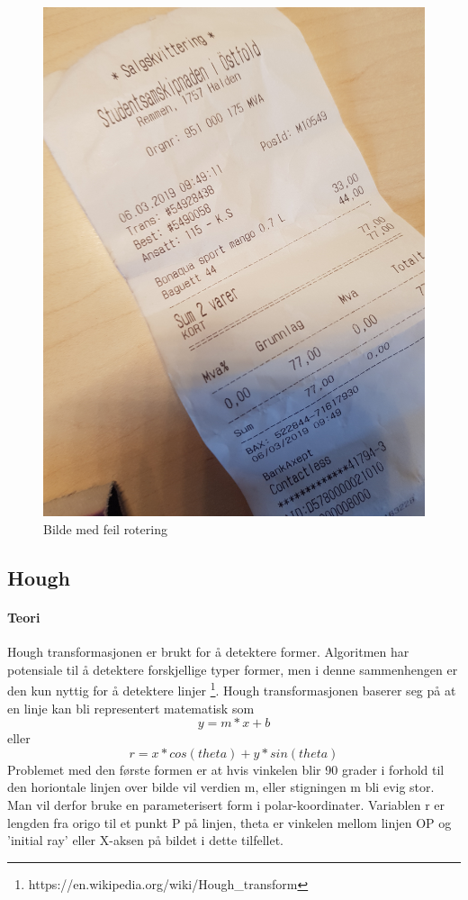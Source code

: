 \documentclass{article}
\begin{document}
\begin{figure}[h]
\centering
\includegraphics[scale=0.05, angle=270]{images/skewed45}
\caption{Bilde med feil rotering}
\label{fig:skewed45}
\end{figure}

\subsection{Hough}
\paragraph{Teori}
Hough transformasjonen er brukt for å detektere former. Algoritmen har potensiale til å detektere forskjellige typer former, men i denne sammenhengen er den kun nyttig for å detektere linjer \footnote{https://en.wikipedia.org/wiki/Hough\_transform}. Hough transformasjonen baserer seg på at en linje kan bli representert matematisk som $$y = m * x + b$$ eller $$r = x * cos(theta) + y * sin(theta)$$ Problemet med den første formen er at hvis vinkelen blir 90 grader i forhold til den horiontale linjen over bilde vil verdien m, eller stigningen m bli evig stor. Man vil derfor bruke en parameterisert form i polar-koordinater. Variablen r er lengden fra origo til et punkt P på linjen, theta er vinkelen mellom linjen OP og 'initial ray' eller X-aksen på bildet i dette tilfellet.
\end{document}

